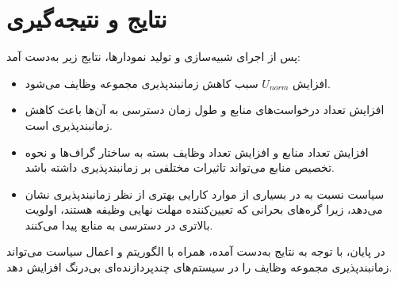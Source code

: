 \documentclass[12pt,a4paper]{report}
\begin{document}
\chapter{نتایج و نتیجه‌گیری}
پس از اجرای شبیه‌سازی و تولید نمودارها، نتایج زیر به‌دست آمد:
\begin{itemize}
\item افزایش $U_{norm}$ سبب کاهش زمانبندپذیری مجموعه وظایف می‌شود.
\item افزایش تعداد درخواست‌های منابع و طول زمان دسترسی به آن‌ها باعث کاهش زمانبندپذیری است.
\item افزایش تعداد منابع و افزایش تعداد وظایف بسته به ساختار گراف‌ها و نحوه تخصیص منابع می‌تواند تاثیرات مختلفی بر زمانبندپذیری داشته باشد.
\item سیاست  نسبت به  در بسیاری از موارد کارایی بهتری از نظر زمانبندپذیری نشان می‌دهد، زیرا گره‌های بحرانی که تعیین‌کننده مهلت نهایی وظیفه هستند، اولویت بالاتری در دسترسی به منابع پیدا می‌کنند.
\end{itemize}

در پایان، با توجه به نتایج به‌دست آمده،  همراه با الگوریتم  و اعمال سیاست  می‌تواند زمانبندپذیری مجموعه وظایف را در سیستم‌های چندپردازنده‌ای بی‌درنگ افزایش دهد.
\end{document}
